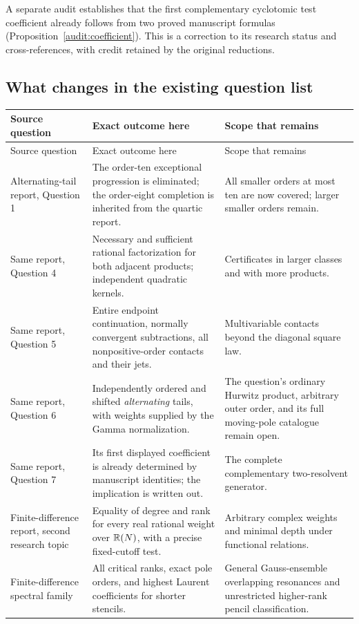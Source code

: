 A separate audit establishes that the first complementary cyclotomic
test coefficient already follows from two proved manuscript formulas
(Proposition~\ref{audit:coefficient}). This is a correction to its
research status and cross-references, with credit retained by the
original reductions.

\subsection{What changes in the existing question list}

\begingroup\small
\begin{longtable}{@{}>{\raggedright\arraybackslash}p{}>{\raggedright\arraybackslash}p{}>{\raggedright\arraybackslash}p{}@{}}
\toprule
Source question & Exact outcome here & Scope that remains \\
\midrule
\endfirsthead
\toprule Source question & Exact outcome here & Scope that remains \\
\midrule\endhead
Alternating-tail report, Question 1 & The order-ten exceptional
progression is eliminated; the order-eight completion is inherited
from the quartic report. & All smaller orders at most ten are now
covered; larger smaller orders remain. \\
\addlinespace
Same report, Question 4 & Necessary and sufficient rational
factorization for both adjacent products; independent quadratic
kernels. & Certificates in larger classes and with more products. \\
\addlinespace
Same report, Question 5 & Entire endpoint continuation, normally
convergent subtractions, all nonpositive-order contacts and their jets. &
Multivariable contacts beyond the diagonal square law. \\
\addlinespace
Same report, Question 6 & Independently ordered and shifted
\emph{alternating} tails, with weights supplied by the Gamma
normalization. & The question's ordinary Hurwitz product, arbitrary
outer order, and its full moving-pole catalogue remain open. \\
\addlinespace
Same report, Question 7 & Its first displayed coefficient is already
determined by manuscript identities; the implication is written out. &
The complete complementary two-resolvent generator. \\
\addlinespace
Finite-difference report, second research topic & Equality of degree
and rank for every real rational weight over $\mathbb R(N)$, with a precise
fixed-cutoff test. & Arbitrary complex weights and minimal depth
under functional relations. \\
\addlinespace
Finite-difference spectral family & All critical ranks, exact pole
orders, and highest Laurent coefficients for shorter stencils. &
General Gauss-ensemble overlapping resonances and unrestricted
higher-rank pencil classification. \\
\bottomrule
\end{longtable}
\endgroup

